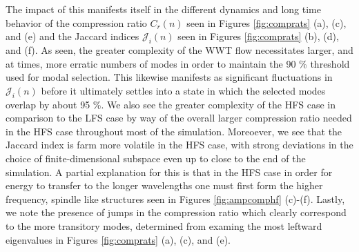 \documentclass[aps,prl,preprint,groupedaddress]{revtex4-1}
\begin{document}
The impact of this manifests itself in the different dynamics and long time behavior of the compression ratio $C_{r}(n)$  seen in Figures \ref{fig:comprats} (a), (c), and (e) and the Jaccard indices $\mathcal{J}_{i}(n)$ seen in Figures \ref{fig:comprats} (b), (d), and (f).  As seen, the greater complexity of the WWT flow necessitates larger, and at times, more erratic numbers of modes in order to maintain the 90 \% threshold used for modal selection.  This likewise manifests as significant fluctuations in $\mathcal{J}_{i}(n)$ before it ultimately settles into a state in which the selected modes overlap by about 95 \%.   We also see the greater complexity of the HFS case in comparison to the LFS case by way of the overall larger compression ratio needed in the HFS case throughout most of the simulation.  Moreoever, we see that the Jaccard index is farm more volatile in the HFS case, with strong deviations in the choice of finite-dimensional subspace even up to close to the end of the simulation.  A partial explanation for this is that in the HFS case in order for energy to transfer to the longer wavelengths one must first form the higher frequency, spindle like structures seen in Figures \ref{fig:ampcomphf} (c)-(f).  Lastly, we note the presence of jumps in the compression ratio which clearly correspond to the more transitory modes, determined from examing the most leftward eigenvalues in Figures \ref{fig:comprats} (a), (c), and (e).
\end{document}
